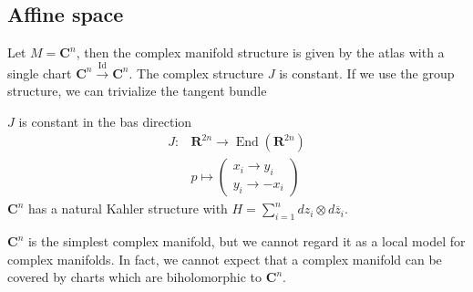 \documentclass[
11pt, %
letterpaper， %
oneside, %
headinclude,footinclude, %
BCOR5mm, %
]{scrartcl}
\newcommand{\R}{{\mathbf{R}}}
\newcommand{\C}{{\mathbf{C}}}
\newcommand{\End}{\operatorname{End}}
\newcommand{\id}{\operatorname{Id}}
\begin{document}
\subsection{Affine space}
\begin{ex}[Affine space $A^n_{\C}=\C^n$]
	Let $M=\C^n$, then the complex manifold structure is given by the atlas with a single chart $\C^n \stackrel{\id}{\to }\C^n$. The complex structure $J$ is constant. If we use the group structure, we can trivialize the tangent bundle\begin{center}
	\end{center}
$J$ is constant in the bas direction
\begin{align*}
J:& \R^{2n} \to \End(\R^{2n})\\
&p \mapsto \begin{pmatrix}
x_i \to y_i\\
y_i \to -x_i
\end{pmatrix}
\end{align*} 
$\C^n$ has a natural Kahler structure with $H=\sum_{i=1}^{n} dz_i\otimes d\overline{z}_i$.
\end{ex}
\begin{rem}
	$\C^n$ is the simplest complex manifold, but we cannot regard it as a local model for complex manifolds. In fact, we cannot expect that a complex manifold can be covered by charts which are biholomorphic to $\C^n$.
\end{rem}
\end{document}
